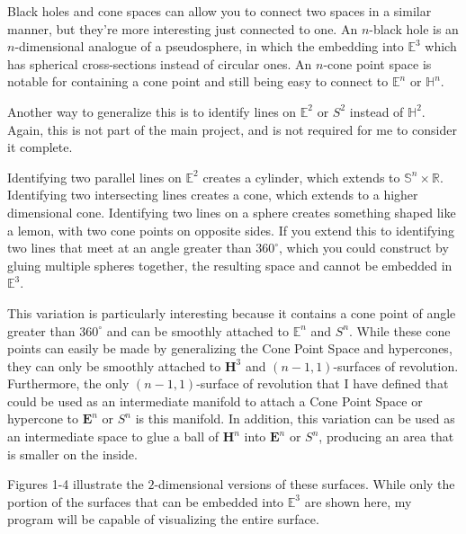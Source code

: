 \documentclass[12pt]{amsart}
\newcommand{\ignore}[1]{}
\begin{document}
Black holes and cone spaces can allow you to connect two spaces in a similar manner, but they're more interesting just connected to one. \ignore{Why?} An $n$-black hole is an $n$-dimensional analogue of a pseudosphere, in which the embedding into $\mathbb{E}^3$ which has spherical cross-sections instead of circular ones. An $n$-cone point space is notable for containing a cone point and still being easy to connect to $\mathbb{E}^n$ or $\mathbb{H}^n$.

Another way to generalize this is to identify lines on $\mathbb{E}^2$ or $S^2$ instead of $\mathbb{H}^2$. Again, this is not part of the main project, and is not required for me to consider it complete.

Identifying two parallel lines on $\mathbb{E}^2$ creates a cylinder, which extends to $\mathbb{S}^n \times \mathbb{R}$. Identifying two intersecting lines creates a cone, which extends to a higher dimensional cone. Identifying two lines on a sphere creates something shaped like a lemon, with two cone points on opposite sides. If you extend this to identifying two lines that meet at an angle greater than $360^\circ$, which you could construct by gluing multiple spheres together, the resulting space and cannot be embedded in $\mathbb{E}^3$.

This variation is particularly interesting because it contains a cone point of angle greater than $360^\circ$ and can be smoothly attached to $\mathbb{E}^n$ and $S^n$. While these cone points can easily be made by generalizing the Cone Point Space and hypercones, they can only be smoothly attached to $\textbf{H}^3$ and $(n-1,1)$-surfaces of revolution. Furthermore, the only $(n-1,1)$-surface of revolution that I have defined that could be used as an intermediate manifold to attach a Cone Point Space or hypercone to $\textbf{E}^n$ or $S^n$ is this manifold. In addition, this variation can be used as an intermediate space to glue a ball of $\textbf{H}^n$ into $\textbf{E}^n$ or $S^n$, producing an area that is smaller on the inside.

Figures 1-4 illustrate the $2$-dimensional versions of these surfaces. While only the portion of the surfaces that can be embedded into $\mathbb{E}^3$ are shown here, my program will be capable of visualizing the entire surface.
\end{document}
